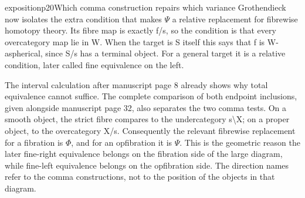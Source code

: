 \begin{dcomment}{exposition}{p20}{Which comma construction repairs which variance}
Grothendieck now isolates the extra condition that makes \ensuremath{\Psi} a relative replacement for fibrewise homotopy theory. Its fibre map is exactly f/s, so the condition is that every overcategory map lie in W. When the target is S itself this says that f is W-aspherical, since S/s has a terminal object. For a general target it is a relative condition, later called fine equivalence on the left.

The interval calculation after manuscript page 8 already shows why total equivalence cannot suffice. The complete comparison of both endpoint inclusions, given alongside manuscript page 32, also separates the two comma tests. On a smooth object, the strict fibre compares to the undercategory s\textbackslash{}X; on a proper object, to the overcategory X/s. Consequently the relevant fibrewise replacement for a fibration is \ensuremath{\Phi}, and for an opfibration it is \ensuremath{\Psi}. This is the geometric reason the later fine-right equivalence belongs on the fibration side of the large diagram, while fine-left equivalence belongs on the opfibration side. The direction names refer to the comma constructions, not to the position of the objects in that diagram.

\end{dcomment}

